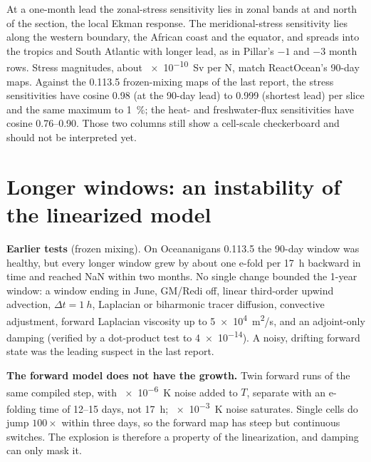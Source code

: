 \documentclass[10pt]{article}
\begin{document}
At a one-month lead the zonal-stress sensitivity lies in zonal bands at and north of the section, the local Ekman
response. The meridional-stress sensitivity lies along the western boundary, the African coast and the equator, and
spreads into the tropics and South Atlantic with longer lead, as in Pillar's $-1$ and $-3$ month rows. Stress
magnitudes, about \SI{e-10}{Sv} per N, match ReactOcean's 90-day maps. Against the 0.113.5 frozen-mixing maps of the
last report, the stress sensitivities have cosine 0.98 (at the 90-day lead) to 0.999 (shortest lead) per slice and
the same maximum to \SI{1}{\percent}; the heat- and freshwater-flux sensitivities have cosine 0.76--0.90. Those two
columns still show a cell-scale checkerboard and should not be interpreted yet.

\section{Longer windows: an instability of the linearized model}
\label{sec:long}

\textbf{Earlier tests} (frozen mixing). On Oceananigans 0.113.5 the 90-day window was healthy, but every longer
window grew by about one e-fold per \SI{17}{h} backward in time and reached NaN within two months. No single change
bounded the 1-year window: a window ending in June, GM/Redi off, linear third-order upwind advection,
$\Delta t = \SI{1}{h}$, Laplacian or biharmonic tracer diffusion, convective adjustment, forward Laplacian viscosity up
to \SI{5e4}{m^2/s}, and an adjoint-only damping (verified by a dot-product test to \num{4e-14}). A noisy, drifting
forward state was the leading suspect in the last report.

\textbf{The forward model does not have the growth.} Twin forward runs of the same compiled step, with
\SI{e-6}{K} noise added to $T$, separate with an e-folding time of 12--15 days, not \SI{17}{h}; \SI{e-3}{K} noise
saturates. Single cells do jump $100\times$ within three days, so the forward map has steep but continuous switches. The
explosion is therefore a property of the linearization, and damping can only mask it.
\end{document}
